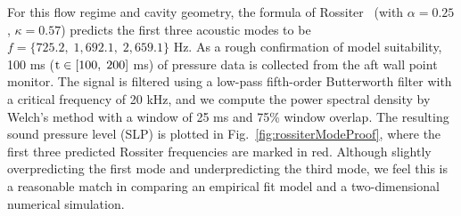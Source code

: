 For this flow regime and cavity geometry, the formula of Rossiter~\cite{Rossiter1964} (with $\alpha = 0.25$, $\kappa = 0.57$) predicts the first three acoustic modes to be $f = \{725.2, \; 1,692.1, \; 2,659.1\}$ Hz. As a rough confirmation of model suitability, 100 ms ($\text{t} \in [100, \; 200]$ ms) of pressure data is collected from the aft wall point monitor. The signal is filtered using a low-pass fifth-order Butterworth filter with a critical frequency of 20 kHz, and we compute the power spectral density by Welch's method with a window of 25 ms and 75\% window overlap. The resulting sound pressure level (SLP) is plotted in Fig.~\ref{fig:rossiterModeProof}, where the first three predicted Rossiter frequencies are marked in red. Although slightly overpredicting the first mode and underpredicting the third mode, we feel this is a reasonable match in comparing an empirical fit model and a two-dimensional numerical simulation.

